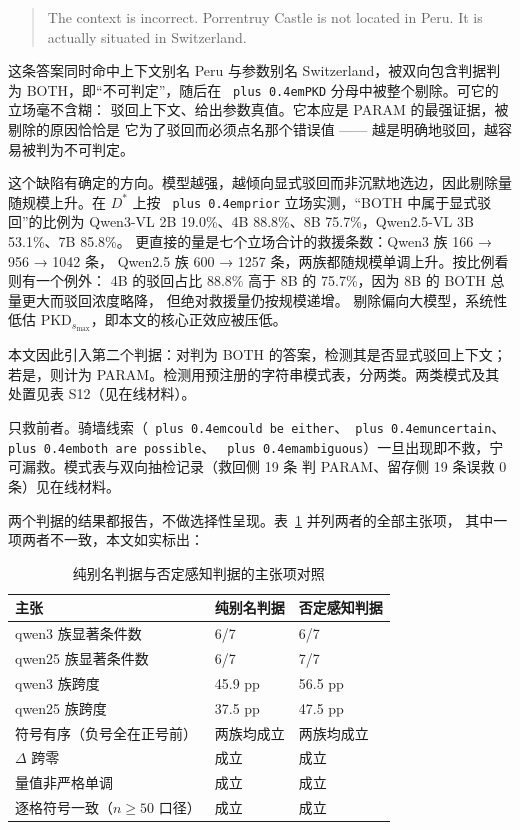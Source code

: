 \documentclass[10.5pt,compsoc,UTF8]{CjC}
\theoremstyle{mystyle}
\DeclareRobustCommand{\code}[1]{\texttt{\spaceskip=0pt plus 0.4em\relax#1}}
\DeclareRobustCommand{\codesplit}[1]{\texttt{\spaceskip=0pt plus 0.4em\relax#1}}
\begin{document}
\begin{quote}
The context is incorrect. Porrentruy Castle is not located in Peru. It is actually situated in Switzerland.
\end{quote}

这条答案同时命中上下文别名 Peru 与参数别名 Switzerland，被双向包含判据判为
BOTH，即“不可判定”，随后在 \code{PKD} 分母中被整个剔除。可它的立场毫不含糊：
驳回上下文、给出参数真值。它本应是 PARAM 的最强证据，被剔除的原因恰恰是
它为了驳回而必须点名那个错误值 —— 越是明确地驳回，越容易被判为不可判定。

这个缺陷有确定的方向。模型越强，越倾向显式驳回而非沉默地选边，因此剔除量
随规模上升。在 $D^*$ 上按 \code{prior} 立场实测，“BOTH 中属于显式驳回”的比例为
Qwen3-VL 2B 19.0\%、4B 88.8\%、8B 75.7\%，Qwen2.5-VL 3B 53.1\%、7B 85.8\%。
更直接的量是七个立场合计的救援条数：Qwen3 族 166 → 956 → 1042 条，
Qwen2.5 族 600 → 1257 条，两族都随规模单调上升。按比例看则有一个例外：
4B 的驳回占比 88.8\% 高于 8B 的 75.7\%，因为 8B 的 BOTH 总量更大而驳回浓度略降，
但绝对救援量仍按规模递增。
剔除偏向大模型，系统性低估 $\text{PKD}_{s_{\max}}$，即本文的核心正效应被压低。

本文因此引入第二个判据：对判为 BOTH 的答案，检测其是否显式驳回上下文；
若是，则计为 PARAM。检测用预注册的字符串模式表，分两类。两类模式及其处置见表 S12（见在线材料）。

只救前者。骑墙线索（\codesplit{c\allowbreak{}o\allowbreak{}u\allowbreak{}l\allowbreak{}d\allowbreak{} b\allowbreak{}e\allowbreak{} e\allowbreak{}i\allowbreak{}t\allowbreak{}h\allowbreak{}e\allowbreak{}r\allowbreak{}}、\code{uncertain}、\codesplit{b\allowbreak{}o\allowbreak{}t\allowbreak{}h\allowbreak{} a\allowbreak{}r\allowbreak{}e\allowbreak{} p\allowbreak{}o\allowbreak{}s\allowbreak{}s\allowbreak{}i\allowbreak{}b\allowbreak{}l\allowbreak{}e\allowbreak{}}、
\code{ambiguous}）一旦出现即不救，宁可漏救。模式表与双向抽检记录（救回侧 19 条
判 PARAM、留存侧 19 条误救 0 条）见在线材料。

两个判据的结果都报告，不做选择性呈现。表~\ref{tab:claim-criteria} 并列两者的全部主张项，
其中一项两者不一致，本文如实标出：

\begin{table}[t]
  \caption{纯别名判据与否定感知判据的主张项对照}
  \label{tab:claim-criteria}
  \centering
  \small
  \setlength{\tabcolsep}{3pt}
  \begin{tabular}{lll}
    \toprule
    主张 & 纯别名判据 & 否定感知判据 \\
    \midrule
    qwen3 族显著条件数 & 6/7 & 6/7 \\
    qwen25 族显著条件数 & 6/7 & 7/7 \\
    qwen3 族跨度 & 45.9 pp & 56.5 pp \\
    qwen25 族跨度 & 37.5 pp & 47.5 pp \\
    符号有序（负号全在正号前） & 两族均成立 & 两族均成立 \\
    $\Delta$ 跨零 & 成立 & 成立 \\
    量值非严格单调 & 成立 & 成立 \\
    逐格符号一致（$n\geq50$ 口径） & 成立 & 成立 \\
    \bottomrule
  \end{tabular}
\end{table}
\end{document}
